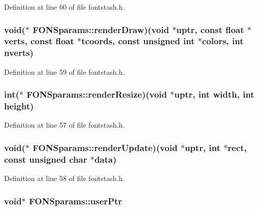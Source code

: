 Definition at line 60 of file fontstash.\+h.

\hypertarget{struct_f_o_n_sparams_ade57583dd6f18eada98763a4f1817bf9}{
\subsubsection[{render\+Draw}]{\setlength{\rightskip}{0pt plus 5cm}void($\ast$ F\+O\+N\+Sparams\+::render\+Draw)(void $\ast$uptr, const float $\ast$verts, const float $\ast$tcoords, const unsigned int $\ast$colors, int nverts)}}\label{struct_f_o_n_sparams_ade57583dd6f18eada98763a4f1817bf9}


Definition at line 59 of file fontstash.\+h.

\hypertarget{struct_f_o_n_sparams_ad3fc02cf5846a215e7b23f583681e06a}{
\subsubsection[{render\+Resize}]{\setlength{\rightskip}{0pt plus 5cm}int($\ast$ F\+O\+N\+Sparams\+::render\+Resize)(void $\ast$uptr, int {\bf width}, int {\bf height})}}\label{struct_f_o_n_sparams_ad3fc02cf5846a215e7b23f583681e06a}


Definition at line 57 of file fontstash.\+h.

\hypertarget{struct_f_o_n_sparams_aceb5385a77ddcfb142909967a0d120e7}{
\subsubsection[{render\+Update}]{\setlength{\rightskip}{0pt plus 5cm}void($\ast$ F\+O\+N\+Sparams\+::render\+Update)(void $\ast$uptr, int $\ast$rect, const unsigned char $\ast$data)}}\label{struct_f_o_n_sparams_aceb5385a77ddcfb142909967a0d120e7}


Definition at line 58 of file fontstash.\+h.

\hypertarget{struct_f_o_n_sparams_a3a6a794c1b7b473d0ac6beb232a8f1e9}{
\subsubsection[{user\+Ptr}]{\setlength{\rightskip}{0pt plus 5cm}void$\ast$ F\+O\+N\+Sparams\+::user\+Ptr}}\label{struct_f_o_n_sparams_a3a6a794c1b7b473d0ac6beb232a8f1e9}


